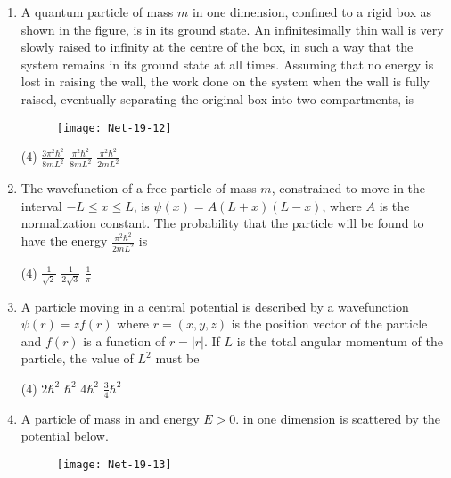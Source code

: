 \begin{enumerate}
\begin{tasks}
	\task[\textbf{b.}] Decreases by a term of order $\varepsilon$
	\task[\textbf{c.}]Increases by a term of order $\varepsilon^{2}$
	\task[\textbf{d.}]  Decreases by a term of order $\varepsilon^{2}$
\end{tasks}
\item  A quantum particle of mass $m$ in one dimension, confined to a rigid box as shown in the figure, is in its ground state. An infinitesimally thin wall is very slowly raised to infinity at the centre of the box, in such a way that the system remains in its ground state at all times. Assuming that no energy is lost in raising the wall, the work done on the system when the wall is fully raised, eventually separating the original box into two compartments, is
\begin{figure}[H]
	\centering
	\texttt{[image: Net-19-12]}
\end{figure}
 \begin{tasks}(4)
	\task[\textbf{a.}]$\frac{3 \pi^{2} \hbar^{2}}{8 m L^{2}}$
	\task[\textbf{b.}]$\frac{\pi^{2} \hbar^{2}}{8 m L^{2}}$
	\task[\textbf{c.}] $\frac{\pi^{2} \hbar^{2}}{2 m L^{2}}$
\end{tasks}
\item  The wavefunction of a free particle of mass $m$, constrained to move in the interval $-L \leq x \leq L$, is $\psi(x)=A(L+x)(L-x)$, where $A$ is the normalization constant. The probability that the particle will be found to have the energy $\frac{\pi^{2} \hbar^{2}}{2 m L^{2}}$ is
 \begin{tasks}(4)
	\task[\textbf{b.}]$\frac{1}{\sqrt{2}}$
	\task[\textbf{c.}]$\frac{1}{2 \sqrt{3}}$
	\task[\textbf{d.}] $\frac{1}{\pi}$ 
\end{tasks}
\item  A particle moving in a central potential is described by a wavefunction $\psi(r)=z f(r)$ where $r=(x, y, z)$ is the position vector of the particle and $f(r)$ is a function of $r=|r|$.
If $L$ is the total angular momentum of the particle, the value of $L^{2}$ must be
 \begin{tasks}(4)
	\task[\textbf{a.}]$2 \hbar^{2}$
	\task[\textbf{b.}]$\hbar^{2}$
	\task[\textbf{c.}]$4 \hbar^{2}$
	\task[\textbf{d.}]$\frac{3}{4} \hbar^{2}$ 
\end{tasks}
\item  A particle of mass in and energy $E>0$. in one dimension is scattered by the potential below.
\begin{figure}[H]
	\centering
	\texttt{[image: Net-19-13]}

\end{figure}
\end{enumerate}
